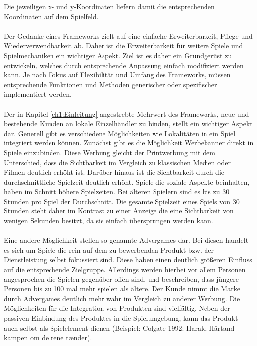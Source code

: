 Die jeweiligen x- und y-Koordinaten liefern damit die entsprechenden Koordinaten auf dem Spielfeld.
\\\\
Der Gedanke eines Frameworks zielt auf eine einfache Erweiterbarkeit, Pflege und Wiederverwendbarkeit ab. Daher ist die Erweiterbarkeit für weitere Spiele und Spielmechaniken ein wichtiger Aspekt. Ziel ist es daher ein Grundgerüst zu entwickeln, welches durch entsprechende Anpassung einfach modifiziert werden kann.
Je nach Fokus auf Flexibilität und Umfang des Frameworks, müssen entsprechende Funktionen und Methoden generischer oder spezifischer implementiert werden.
\\\\
Der in Kapitel \ref{ch1:Einleitung} angestrebte Mehrwert des Frameworks, neue und bestehende Kunden an lokale Einzelhändler zu binden, stellt ein wichtiger Aspekt dar. Generell gibt es verschiedene Möglichkeiten wie Lokalitäten in ein Spiel integriert werden können.\cite{Nelson.2002}
Zunächst gibt es die Möglichkeit Werbebanner direkt in Spiele einzubinden.\cite{Nelson.2004} Diese Werbung gleicht der Printwerbung mit dem Unterschied, dass die Sichtbarkeit im Vergleich zu klassischen Medien oder Filmen deutlich erhöht ist.\cite{Edery.2008} Darüber hinaus ist die Sichtbarkeit durch die durchschnittliche Spielzeit deutlich erhöht. Spiele die soziale Aspekte beinhalten, haben im Schnitt höhere Spielzeiten.\cite{Ducheneaut.2006} Bei älteren Spielern sind es bis zu 30 Stunden pro Spiel der Durchschnitt. Die gesamte Spielzeit eines Spiels von 30 Stunden steht daher im Kontrast zu einer Anzeige  die eine Sichtbarkeit von wenigen Sekunden besitzt, da sie einfach übersprungen werden kann.
\\\\
Eine andere Möglichkeit stellen so genannte Advergames dar. Bei diesen handelt es sich um Spiele die rein auf dem zu bewerbenden Produkt bzw. der Dienstleistung selbst fokussiert sind. Diese haben einen deutlich größeren Einfluss auf die entsprechende Zielgruppe. Allerdings werden hierbei vor allem Personen angesprochen die Spielen gegenüber offen sind.\cite{Winkler.2006} \textcite{Chen.2001} und \textcite{Dahl.2009} beschreiben, dass jüngere Personen bis zu 100 mal mehr spielen als ältere. Der Kunde nimmt die Marke durch Advergames deutlich mehr wahr im Vergleich zu anderer Werbung.
Die Möglichkeiten für die Integration von Produkten sind vielfältig. Neben der passiven Einbindung des Produktes in die Spielumgebung, kann das Produkt auch selbst als Spielelement dienen (Beispiel: Colgate 1992: Harald Hårtand -- kampen om de rene tænder).
